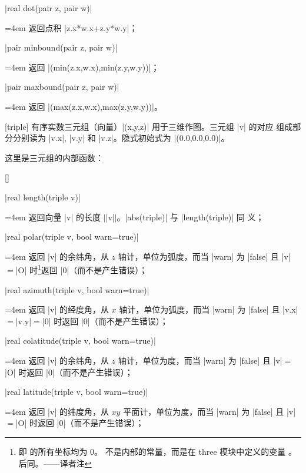 \documentclass[nofonts,CJKnormalspaces]{ctexbook}[2009/05/20]
\makeatletter
\newenvironment{funclist}{\trivlist
  \parindent=0pt
\item[]
  \def\item{\medskip\par\leftskip=0pt}
  \def\go{\par\leftskip=4em}}
{\endtrivlist}
\newenvironment{typelist}{\itemize
  \let\old@item\@item
  \def\@item[##1]{\expandafter\old@item[\ttfamily\color{type!50!black}##1]}}
{\enditemize}
\newcommand*\prgname[1]{\textsf{#1}}
\newcommand\transnote[1]{\footnote{#1——译者注}}
\makeatother
\begin{document}
\begin{typelist}
\begin{funclist}
\item |real dot(pair z, pair w)| \go
  返回点积 |z.x*w.x+z.y*w.y|；

\item |pair minbound(pair z, pair w)| \go
  返回 |(min(z.x,w.x),min(z.y,w.y))|；

\item |pair maxbound(pair z, pair w)| \go
  返回 |(max(z.x,w.x),max(z.y,w.y))|。
\end{funclist}

\item[triple] 有序实数三元组（向量）|(x,y,z)| 用于三维作图。三元组 |v| 的对应
组成部分分别读为 |v.x|, |v.y| 和 |v.z|。隐式初始式为 |(0.0,0.0,0.0)|。

这里是三元组的内部函数：
\begin{funclist}
\item |real length(triple v)| \go
  返回向量 |v| 的长度 $\vert$|v|$\vert$。|abs(triple)| 与 |length(triple)| 同
  义；

\item |real polar(triple v, bool warn=true)| \go
  返回 |v| 的余纬角，从 $z$ 轴计，单位为弧度，而当 |warn| 为 |false| 且
  |v|${}={}$|O| 时\transnote{即  的所有坐标均为 0。
   不是内部的常量，而是在 \prgname{three} 模块中定义的变量
  \inlinecode{(0,0,0)}。后同。}返回 |0|（而不是产生错误）；

\item |real azimuth(triple v, bool warn=true)| \go
  返回 |v| 的经度角，从 $x$ 轴计，单位为弧度，而当 |warn| 为 |false| 且
  |v.x|${}={}$|v.y|${}={}$|0| 时返回 |0|（而不是产生错误）；

\item |real colatitude(triple v, bool warn=true)| \go
  返回 |v| 的余纬角，从 $z$ 轴计，单位为度，而当 |warn| 为 |false| 且
  |v|${}={}$|O| 时返回 |0|（而不是产生错误）；

\item |real latitude(triple v, bool warn=true)| \go
  返回 |v| 的纬度角，从 $xy$ 平面计，单位为度，而当 |warn| 为 |false| 且
  |v|${}={}$|O| 时返回 |0|（而不是产生错误）；


\end{funclist}
\end{typelist}
\end{document}
